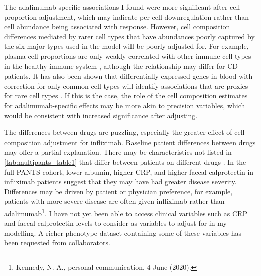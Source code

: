 The adalimumab-specific associations I found were more significant after cell proportion adjustment, 
which may indicate per-cell downregulation rather than cell abundance being associated with response.
However, cell composition differences mediated by rarer cell types that have abundances poorly captured by the six major types used in the model will be poorly adjusted for.
For example, plasma cell proportions are only weakly correlated with other immune cell types in the healthy immune system \autocite{zalocusky201810000Immunomes}, 
although the relationship may differ for \gls{CD} patients.
It has also been shown that differentially expressed genes in blood with correction for only common cell types will 
identify associations that are proxies for rare cell types \autocite{pellegrinocoppola2020CorrectionBothCommon}.
If this is the case, the role of the cell composition estimates for adalimumab-specific effects may be more akin to precision variables, 
which would be consistent with increased significance after adjusting.

The differences between drugs are puzzling, especially the greater effect of cell composition adjustment for infliximab. 
Baseline patient differences between drugs may offer a partial explanation.
There may be characteristics not listed in \cref{tab:multipants_table1} that differ between patients on different drugs \autocite{kennedy2019PredictorsAntiTNFTreatment}.
In the full \gls{PANTS} cohort, lower albumin, higher \gls{CRP}, and higher faecal calprotectin in infliximab patients suggest that they may have had greater disease severity.
Differences may be driven by patient or physician preference, for example, patients with more severe disease are often given infliximab rather than adalimumab\footnote{Kennedy, N. A., personal communication, 4 June (2020).}.
I have not yet been able to access clinical variables such as \gls{CRP} and faecal calprotectin levels to consider as variables to adjust for in my modelling.
A richer phenotype dataset containing some of these variables has been requested from collaborators.

